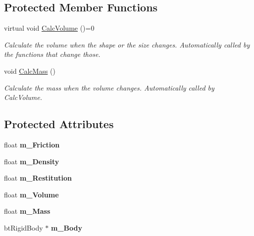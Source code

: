 \subsection*{Protected Member Functions}
\begin{DoxyCompactItemize}
\item 
\mbox{\label{classTarbora_1_1RigidBody_a5f3f505d69241d5dbac5fc3c94b07df0}} 
virtual void \hyperlink{classTarbora_1_1RigidBody_a5f3f505d69241d5dbac5fc3c94b07df0}{Calc\+Volume} ()=0
\begin{DoxyCompactList}\small\item\em Calculate the volume when the shape or the size changes. Automatically called by the functions that change those. \end{DoxyCompactList}\item 
\mbox{\label{classTarbora_1_1RigidBody_ad78189036d2270c9157fca92b741a0d8}} 
void \hyperlink{classTarbora_1_1RigidBody_ad78189036d2270c9157fca92b741a0d8}{Calc\+Mass} ()
\begin{DoxyCompactList}\small\item\em Calculate the mass when the volume changes. Automatically called by Calc\+Volume. \end{DoxyCompactList}\end{DoxyCompactItemize}
\subsection*{Protected Attributes}
\begin{DoxyCompactItemize}
\item 
\mbox{\label{classTarbora_1_1RigidBody_a9663e9ae26e8ca6b53f0e9f35e1613dc}} 
float {\bfseries m\+\_\+\+Friction}
\item 
\mbox{\label{classTarbora_1_1RigidBody_a52a91e03c8a6d0f99f2a1ce1c85971b4}} 
float {\bfseries m\+\_\+\+Density}
\item 
\mbox{\label{classTarbora_1_1RigidBody_ac0b051f209ddc0aae2b79239d8a900f5}} 
float {\bfseries m\+\_\+\+Restitution}
\item 
\mbox{\label{classTarbora_1_1RigidBody_ae9624225a57bb682fb6e86d12677f502}} 
float {\bfseries m\+\_\+\+Volume}
\item 
\mbox{\label{classTarbora_1_1RigidBody_ad112c7c613a0557b132b10b29d62a110}} 
float {\bfseries m\+\_\+\+Mass}
\item 
\mbox{\label{classTarbora_1_1RigidBody_abe5878296d0cfc6796ff6383db14d062}} 
bt\+Rigid\+Body $\ast$ {\bfseries m\+\_\+\+Body}
\end{DoxyCompactItemize}


